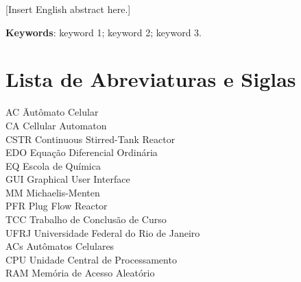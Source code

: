 \documentclass[12pt,oneside]{report}
\begin{document}
[Insert English abstract here.]

\medskip

\textbf{Keywords}: keyword 1; keyword 2; keyword 3.
\newpage

\listoffigures
\newpage

\listoftables
\newpage

\chapter*{Lista de Abreviaturas e Siglas}
\begin{tabbing}
    AC \hspace{2cm} \= Autômato Celular \\
    CA \> Cellular Automaton \\
    CSTR \> Continuous Stirred-Tank Reactor \\
    EDO \> Equação Diferencial Ordinária \\
    EQ \> Escola de Química \\
    GUI \> Graphical User Interface \\
    MM \> Michaelis-Menten \\
    PFR \> Plug Flow Reactor \\
    TCC \> Trabalho de Conclusão de Curso \\
    UFRJ \> Universidade Federal do Rio de Janeiro \\
    ACs \> Autômatos Celulares \\
    CPU \> Unidade Central de Processamento \\
    RAM \> Memória de Acesso Aleatório \\
\end{tabbing}

\end{document}
